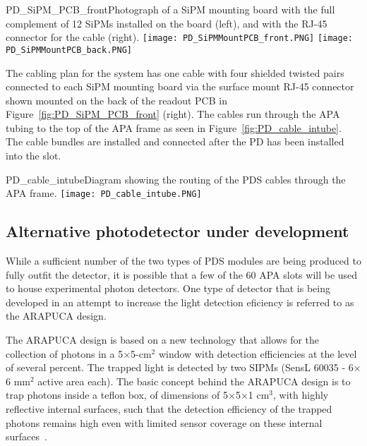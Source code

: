 \begin{cdrfigure}
  {PD_SiPM_PCB_front}{Photograph of a SiPM mounting board
    with the full complement of 12 SiPMs installed on the board (left), and with the 
    RJ-45 connector for the cable (right).}
\texttt{[image: PD\_SiPMMountPCB\_front.PNG]}
\texttt{[image: PD\_SiPMMountPCB\_back.PNG]}
\end{cdrfigure}


The cabling plan for the system has one cable with four shielded twisted pairs 
connected to each SiPM mounting board via the surface mount RJ-45 connector
shown mounted on the back of the readout PCB in 
Figure~\ref{fig:PD_SiPM_PCB_front} (right).  
The cables run through the APA tubing to the top of the APA frame as seen
in Figure~\ref{fig:PD_cable_intube}.
The cable bundles are installed and connected 
after the PD has been installed into the slot.
\begin{cdrfigure}
  {PD_cable_intube}{Diagram showing the routing of the PDS cables
    through the APA frame.}
\texttt{[image: PD\_cable\_intube.PNG]}
\end{cdrfigure}


\subsection{Alternative photodetector under development}

While a sufficient number of the two types of PDS modules are being produced to fully outfit the detector, it is possible that a few of the 60 APA slots will be used to house experimental photon detectors. One type of detector that is being developed in an attempt to increase the light detection eficiency is referred to as the ARAPUCA design.

The ARAPUCA design is based on a new technology that allows for the collection of photons in a 5$\times$5-cm$^2$ window  with detection efficiencies at the level of several percent. The trapped light is detected by two SIPMs (SensL 60035 - 6$\times$6 mm$^2$ active area each). The basic concept behind the ARAPUCA design is to trap photons inside a teflon box, of  dimensions of 5$\times$5$\times$1 cm$^3$, with highly reflective internal surfaces, such that the detection efficiency of the trapped photons remains high even with limited sensor coverage on these internal surfaces~\cite{Machado:2016jqe}.

